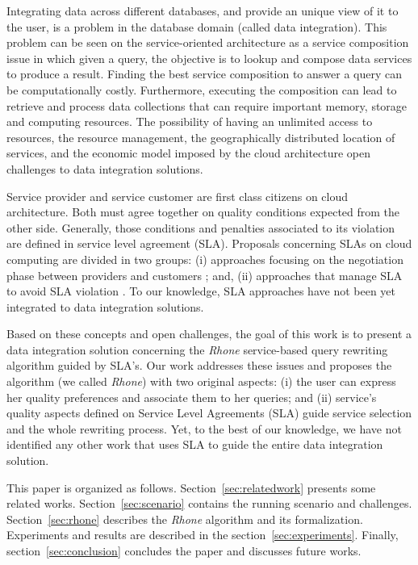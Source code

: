 Integrating data across different databases, and provide an unique view of it
to the user, is a problem in the database domain (called data integration).
This problem can be seen on the service-oriented architecture as a service composition issue in which given a query, the objective is to lookup and compose data services to produce a result. 
% 	
Finding the best service composition to answer a query can be computationally costly. 
Furthermore, executing the composition can lead to retrieve and process data collections that can require important memory, storage and computing resources.
The possibility of having an unlimited access to resources, the resource management, the geographically distributed location of services, and the economic model imposed by the cloud architecture open challenges to data integration solutions.

Service provider and service customer are first class citizens on cloud architecture.
Both must agree together on quality conditions expected from the other side. 
Generally, those conditions and penalties associated to its violation are
defined in service level agreement (SLA). 
Proposals concerning SLAs on cloud computing are divided in two groups: (i)
approaches focusing on the negotiation phase between providers and customers
\cite{}; and, (ii) approaches that manage SLA to avoid SLA violation \cite{}.
To our knowledge, SLA approaches have not been yet integrated to data
integration solutions.

Based on these concepts and open challenges, the goal of this work is to present
a data integration solution concerning the \textit{Rhone} service-based query rewriting algorithm guided by SLA's.
Our work addresses these issues and proposes the algorithm (we
called \textit{Rhone}) with two original aspects: (i) the user can express her
quality preferences and associate them to her queries; and (ii)  service's quality aspects defined on Service Level Agreements (SLA) guide service selection and the whole rewriting process.
Yet, to the best of our knowledge, we have not identified any other work that uses SLA to guide the entire data integration solution.

This paper is organized as follows. Section~\ref{sec:relatedwork} presents
some related works.
Section~\ref{sec:scenario} contains the running scenario and challenges.
Section~\ref{sec:rhone} describes the \textit{Rhone} algorithm and its
formalization.
Experiments and results are described in the section~\ref{sec:experiments}. 
Finally, section~\ref{sec:conclusion} concludes the paper and discusses future works.
